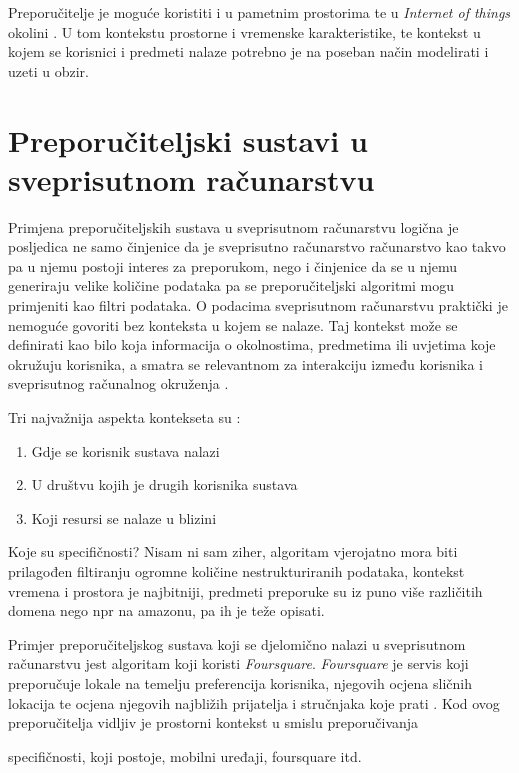 \documentclass[times, utf8, diplomski, numeric]{fer}
\begin{document}
Preporučitelje je moguće koristiti i u pametnim prostorima te u \emph{Internet
of things} okolini \cite{Munoz-Organero2010}. U tom kontekstu prostorne i
vremenske karakteristike, te kontekst u kojem se korisnici i predmeti nalaze
potrebno je na poseban način modelirati i uzeti u obzir.

\section{Preporučiteljski sustavi u sveprisutnom računarstvu}
Primjena preporučiteljskih sustava u sveprisutnom računarstvu logična je
posljedica ne samo činjenice da je sveprisutno računarstvo računarstvo kao takvo
pa u njemu postoji interes za preporukom, nego i činjenice da se u njemu
generiraju velike količine podataka pa se preporučiteljski algoritmi mogu
primjeniti kao filtri podataka. O podacima sveprisutnom računarstvu praktički
je nemoguće govoriti bez konteksta u kojem se nalaze. Taj kontekst može se
definirati kao bilo koja informacija o okolnostima, predmetima ili uvjetima
koje okružuju korisnika, a smatra se relevantnom za interakciju između
korisnika i sveprisutnog računalnog okruženja \cite{RanganathanCampbell}.

Tri najvažnija aspekta kontekseta su \cite{schilit1994context}:
\begin{enumerate}
  \item Gdje se korisnik sustava nalazi
  \item U društvu kojih je drugih korisnika sustava
  \item Koji resursi se nalaze u blizini
\end{enumerate}

Koje su specifičnosti? Nisam ni sam ziher, algoritam vjerojatno mora biti
prilagođen filtiranju ogromne količine nestrukturiranih podataka, kontekst
vremena i prostora je najbitniji, predmeti preporuke su iz puno više različitih
domena nego npr na amazonu, pa ih je teže opisati.

Primjer preporučiteljskog sustava koji se djelomično nalazi u sveprisutnom
računarstvu jest algoritam koji koristi \emph{Foursquare}. \emph{Foursquare} je
servis koji preporučuje lokale na temelju preferencija korisnika, njegovih
ocjena sličnih lokacija te ocjena njegovih najbližih prijatelja i stručnjaka
koje prati \cite{FoursquareAbout}. Kod ovog preporučitelja vidljiv je prostorni
kontekst u smislu preporučivanja

specifičnosti, koji postoje, mobilni uređaji, foursquare itd.
\end{document}

